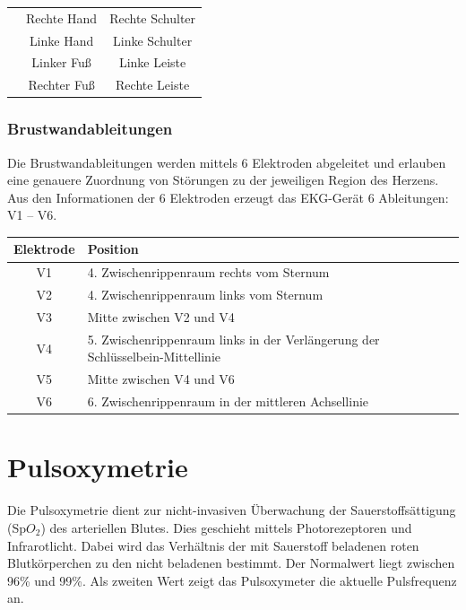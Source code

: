  
\begin{center}
\begin{tabulary}{\linewidth}{CCC}\toprule
{} &  &
\\\midrule
{} & Rechte Hand & Rechte
Schulter
\\
 & Linke Hand & Linke
Schulter
\\
 & Linker Fu{\ss}  & Linke
Leiste
\\
 & Rechter Fu{\ss} & Rechte
Leiste \\\bottomrule
\end{tabulary}
\end{center}

\subsubsection{Brustwandableitungen}

Die Brustwandableitungen werden mittels 6 Elektroden abgeleitet und
erlauben eine genauere Zuordnung von St\"orungen zu der jeweiligen
Region des Herzens. Aus den Informationen der 6 Elektroden erzeugt das
EKG-Gerät 6 Ableitungen: V1 -- V6. 

\begin{center}
\begin{tabulary}{\linewidth}[H]{cL}
\toprule
Elektrode
 &
Position
\\\midrule
V1 & 4. Zwischenrippenraum rechts vom Sternum
\\
V2 & 4. Zwischenrippenraum links vom Sternum
\\
V3 & Mitte zwischen V2 und V4
\\
V4 & 5. Zwischenrippenraum links in der Verlängerung der
Schlüsselbein-Mittellinie
\\
V5 & Mitte zwischen V4 und V6
\\
V6 & 6. Zwischenrippenraum in der mittleren Achsellinie
\\\bottomrule
\end{tabulary}
\end{center}


\section{Pulsoxymetrie}

Die Pulsoxymetrie dient zur nicht-invasiven Überwachung der
Sauerstoffsättigung (Sp$O_2$) des arteriellen Blutes. Dies
geschieht mittels Photorezeptoren und Infrarotlicht. Dabei
wird das Verhältnis der mit Sauerstoff beladenen roten
Blutkörperchen zu den nicht beladenen bestimmt. Der
Normalwert liegt zwischen 96\% und 99\%. Als zweiten Wert
zeigt das Pulsoxymeter die aktuelle Pulsfrequenz an.

